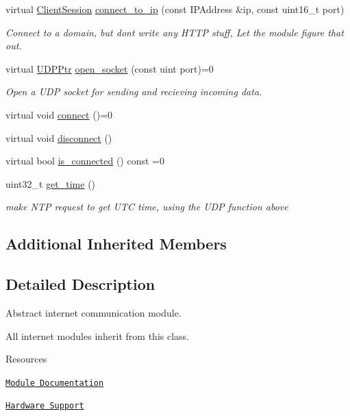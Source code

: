 \begin{DoxyCompactItemize}
virtual \hyperlink{class_loom_internet_plat_a7044d4ef42ec9181d519e6d37365789d}{Client\+Session} \hyperlink{class_loom_internet_plat_aebfc1c711a7fa0eb781e545d7fc757cf}{connect\+\_\+to\+\_\+ip} (const I\+P\+Address \&ip, const uint16\+\_\+t port)
\begin{DoxyCompactList}\small\item\em Connect to a domain, but don\textquotesingle{}t write any H\+T\+TP stuff, Let the module figure that out. \end{DoxyCompactList}\item 
virtual \hyperlink{class_loom_internet_plat_a0b2cc742a6ac5f4f7054b75ea99b345c}{U\+D\+P\+Ptr} \hyperlink{class_loom_internet_plat_a91204905ec272ff1edc608a3aa250745}{open\+\_\+socket} (const uint port)=0
\begin{DoxyCompactList}\small\item\em Open a U\+DP socket for sending and recieving incoming data. \end{DoxyCompactList}\item 
virtual void \hyperlink{class_loom_internet_plat_a24d7c701a3db8e16355b6a33a4e323a6}{connect} ()=0
\item 
virtual void \hyperlink{class_loom_internet_plat_a32af1196a982d84a18e53f8d97e358a1}{disconnect} ()
\item 
virtual bool \hyperlink{class_loom_internet_plat_af9c5c867598c9951db4d404a6a495ce7}{is\+\_\+connected} () const =0
\item 
uint32\+\_\+t \hyperlink{class_loom_internet_plat_a17807cb51c969dbdba980a4d704aef33}{get\+\_\+time} ()
\begin{DoxyCompactList}\small\item\em make N\+TP request to get U\+TC time, using the U\+DP function above \end{DoxyCompactList}\end{DoxyCompactItemize}
\subsection*{Additional Inherited Members}


\subsection{Detailed Description}
Abstract internet communication module. 

All internet modules inherit from this class.

\begin{DoxyParagraph}{Resources}

\begin{DoxyItemize}
\item \href{https://openslab-osu.github.io/Loom/html/class_loom_internet_plat.html}{\tt Module Documentation}
\item \href{https://github.com/OPEnSLab-OSU/Loom/wiki/Hardware-Support#internet-capabilities}{\tt Hardware Support} 
\end{DoxyItemize}
\end{DoxyParagraph}


